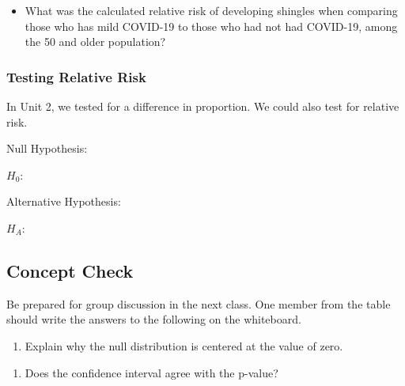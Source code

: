 \documentclass[
]{report}
\providecommand{\tightlist}{%
  \setlength{\itemsep}{0pt}\setlength{\parskip}{0pt}}
\begin{document}
\begin{itemize}
\tightlist
\item
  What was the calculated relative risk of developing shingles when comparing those who has mild COVID-19 to those who had not had COVID-19, among the 50 and older population?
\end{itemize}

\vspace{0.8in}

\subsubsection*{Testing Relative Risk}\label{testing-relative-risk}

In Unit 2, we tested for a difference in proportion. We could also test for relative risk.


Null Hypothesis:

\(H_0:\)

\vspace{0.2in}

Alternative Hypothesis:

\(H_A:\)

\vspace{0.2in}


\subsection{Concept Check}\label{concept-check-1}

Be prepared for group discussion in the next class. One member from the table should write the answers to the following on the whiteboard.

\begin{enumerate}
\def\labelenumi{\arabic{enumi}.}
\tightlist
\item
  Explain why the null distribution is centered at the value of zero.
\end{enumerate}

\vspace{0.5in}

\begin{enumerate}
\def\labelenumi{\arabic{enumi}.}
\setcounter{enumi}{1}
\tightlist
\item
  Does the confidence interval agree with the p-value?
\end{enumerate}
\end{document}
